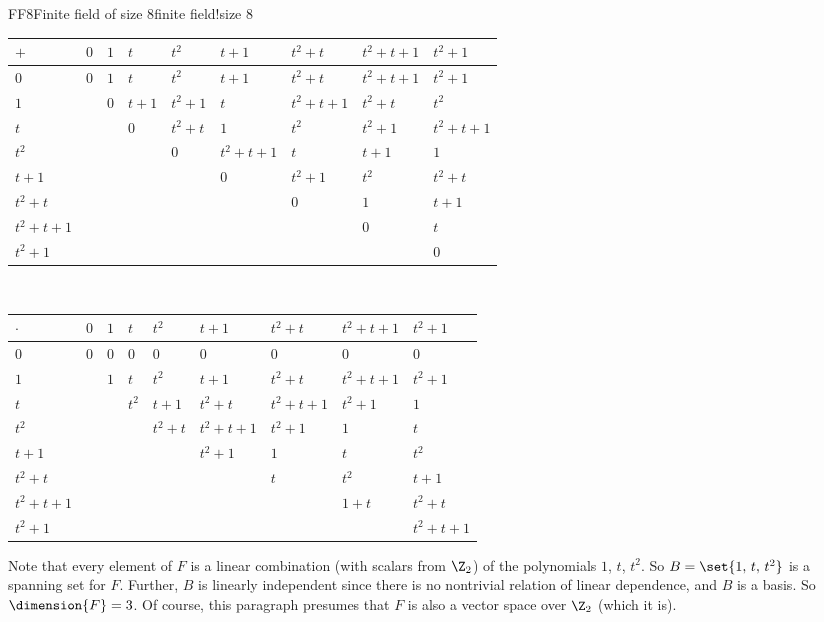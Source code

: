 \begin{example}{FF8}{Finite field of size 8}{finite field!size 8}
%
\noindent
\begin{tabular}{l|llllllll}
$+$       & $0$ & $1$ & $t$   & $t^2$   & $t+1$     & $t^2+t$   & $t^2+t+1$ & $t^2+1$   \\\hline
$0$       & $0$ & $1$ & $t$   & $t^2$   & $t+1$     & $t^2+t$   & $t^2+t+1$ & $t^2+1$   \\
$1$       &     & $0$ & $t+1$ & $t^2+1$ & $t$       & $t^2+t+1$ & $t^2+t$   & $t^2$     \\
$t$       &     &     & $0$   & $t^2+t$ & $1$       & $t^2$     & $t^2+1$   & $t^2+t+1$ \\
$t^2$     &     &     &       & $0$     & $t^2+t+1$ & $t$       & $t+1$     & $1$       \\
$t+1$     &     &     &       &         & $0$       & $t^2+1$   & $t^2$     & $t^2+t$   \\
$t^2+t$   &     &     &       &         &           & $0$       & $1$       & $t+1$     \\
$t^2+t+1$ &     &     &       &         &           &           & $0$       & $t$       \\
$t^2+1$   &     &     &       &         &           &           &           & $0$
\end{tabular}\\[2ex]\par
%
\noindent
\begin{tabular}{l|llllllll}
$\cdot$   & $0$ & $1$ & $t$   & $t^2$   & $t+1$     & $t^2+t$   & $t^2+t+1$ & $t^2+1$   \\\hline
$0$       & $0$ & $0$ & $0$   & $0$     & $0$       & $0$       & $0$       & $0$       \\
$1$       &     & $1$ & $t$   & $t^2$   & $t+1$     & $t^2+t$   & $t^2+t+1$ & $t^2+1$   \\
$t$       &     &     & $t^2$ & $t+1$   & $t^2+t$   & $t^2+t+1$ & $t^2+1$   & $1$       \\
$t^2$     &     &     &       & $t^2+t$ & $t^2+t+1$ & $t^2+1$   & $1$       & $t$       \\
$t+1$     &     &     &       &         & $t^2+1$   & $1$       & $t$       & $t^2$     \\
$t^2+t$   &     &     &       &         &           & $t$       & $t^2$     & $t+1$     \\
$t^2+t+1$ &     &     &       &         &           &           & $1+t$     & $t^2+t$   \\
$t^2+1$   &     &     &       &         &           &           &           & $t^2+t+1$
\end{tabular}\par
%
Note that every element of $F$ is a linear combination (with scalars from $\Z_2$) of the polynomials $1$, $t$, $t^2$.  So $B=\set{1,\,t,\,t^2}$ is a spanning set for $F$.  Further, $B$ is linearly independent since there is no nontrivial relation of linear dependence, and $B$ is a basis.  So $\dimension{F}=3$.  Of course, this paragraph presumes that $F$ is also a vector space over $\Z_2$ (which it is).
%
\end{example}

